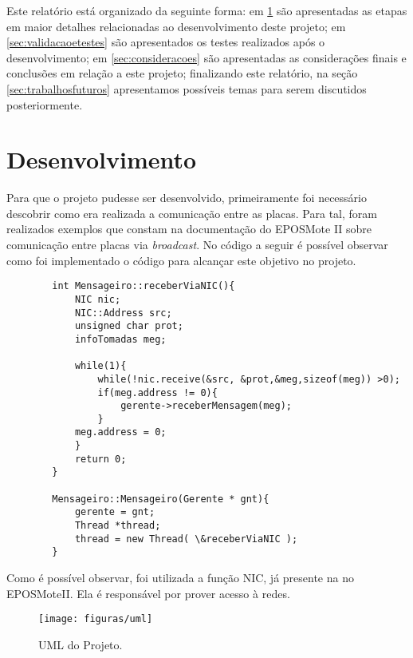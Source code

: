 \documentclass[article,11pt,oneside,a4paper,english,brazil]{abntex2}
\begin{document}
	Este relatório está organizado da seguinte forma: em \ref{sec:desenvolvimento} são apresentadas as etapas em maior detalhes relacionadas ao desenvolvimento deste projeto; em \ref{sec:validacaoetestes} são apresentados os testes realizados após o desenvolvimento; em \ref{sec:consideracoes} são apresentadas as considerações finais e conclusões em relação a este projeto; finalizando este relatório, na seção \ref{sec:trabalhosfuturos} apresentamos possíveis temas para serem discutidos posteriormente.
	
\section{Desenvolvimento} \label{sec:desenvolvimento}
	
	Para que o projeto pudesse ser desenvolvido, primeiramente foi necessário descobrir como era realizada a comunicação entre as placas. Para tal, foram realizados exemplos que constam na documentação do EPOSMote II sobre comunicação entre placas via \textit{broadcast}. No código a seguir é possível observar como foi implementado o código para alcançar este objetivo no projeto.
		
	\begin{lstlisting}
		int Mensageiro::receberViaNIC(){
			NIC nic;		
			NIC::Address src;
			unsigned char prot;
			infoTomadas meg;
			
			while(1){
				while(!nic.receive(&src, &prot,&meg,sizeof(meg)) >0);
				if(meg.address != 0){
					gerente->receberMensagem(meg);
				}
			meg.address = 0;
			}
			return 0;
		}	
		
		Mensageiro::Mensageiro(Gerente * gnt){
			gerente = gnt;
			Thread *thread;
			thread = new Thread( \&receberViaNIC );
		}
	\end{lstlisting}
	
	Como é possível observar, foi utilizada a função NIC, já presente na no EPOSMoteII. Ela é responsável por prover acesso à redes. 
	
	\begin{figure}[b]
		\centering
		\texttt{[image: figuras/uml]}
		\caption[Short]{UML do Projeto.}
		\label{fig:uml}
	\end{figure}
	
\end{document}

